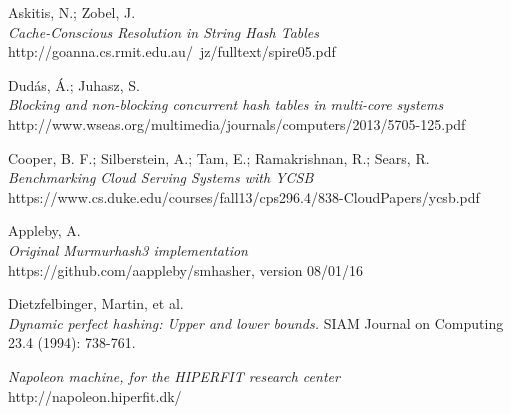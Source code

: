 \documentclass[11pt]{article} %
\begin{document}
\begin{thebibliography}{99}
 Askitis, N.; Zobel, J.\\
 \emph{Cache-Conscious Resolution in String Hash Tables}
 http://goanna.cs.rmit.edu.au/~jz/fulltext/spire05.pdf

 Dudás, Á.; Juhasz, S.\\
 \emph{Blocking and non-blocking concurrent hash tables in multi-core systems}\\
 http://www.wseas.org/multimedia/journals/computers/2013/5705-125.pdf

 Cooper, B. F.; Silberstein, A.; Tam, E.; Ramakrishnan, R.; Sears, R.\\
 \emph{Benchmarking Cloud Serving Systems with YCSB}\\
 https://www.cs.duke.edu/courses/fall13/cps296.4/838-CloudPapers/ycsb.pdf

 Appleby, A.\\
 \emph{Original Murmurhash3 implementation}\\
 https://github.com/aappleby/smhasher, version 08/01/16

 Dietzfelbinger, Martin, et al. \\
 \emph{Dynamic perfect hashing: Upper and lower bounds.}
 SIAM Journal on Computing 23.4 (1994): 738-761.

 \emph{Napoleon machine, for the HIPERFIT research center}\\
 http://napoleon.hiperfit.dk/

 

\end{thebibliography}
\end{document}
